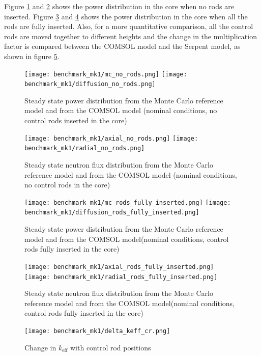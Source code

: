 \documentclass{elsarticle}
\newcommand{\keff}{{\ensuremath{k_{\mathrm{eff}}}} }
\begin{document}
Figure \ref{fig:mk1_no_power} and \ref{fig:mk1_no_rods_power} shows the power distribution in the core when no rods are inserted. Figure \ref{fig:mk1_full_power} and \ref{fig:mk1_full_rods_power} shows the power distribution in the core when all the rods are fully inserted.
Also, for a more quantitative comparison, all the control rods are moved together to different heights and the change in the multiplication factor is compared between the COMSOL model and the Serpent model, as shown in figure \ref{fig:delta_keff_cr}. 



\begin{figure}
\centering 
  \texttt{[image: benchmark\_mk1/mc\_no\_rods.png]}
  \texttt{[image: benchmark\_mk1/diffusion\_no\_rods.png]}
  \caption{Steady state power distribution from the Monte Carlo reference model and from the COMSOL model (nominal conditions, no control rods inserted in the core)}
  \label{fig:mk1_no_power}
\end{figure}

\begin{figure}
\centering 
  \texttt{[image: benchmark\_mk1/axial\_no\_rods.png]}
  \texttt{[image: benchmark\_mk1/radial\_no\_rods.png]}
  \caption{Steady state neutron flux distribution from the Monte Carlo reference model and from the COMSOL model (nominal conditions, no control rods in the core)}
  \label{fig:mk1_no_rods_power}
\end{figure}

\begin{figure}
\centering 
  \texttt{[image: benchmark\_mk1/mc\_rods\_fully\_inserted.png]}
  \texttt{[image: benchmark\_mk1/diffusion\_rods\_fully\_inserted.png]}
  \caption{Steady state power distribution from the Monte Carlo reference model and from the COMSOL model(nominal conditions, control rods fully inserted in the core)}
  \label{fig:mk1_full_power}
\end{figure}

\begin{figure}
\centering 
  \texttt{[image: benchmark\_mk1/axial\_rods\_fully\_inserted.png]}
  \texttt{[image: benchmark\_mk1/radial\_rods\_fully\_inserted.png]}
  \caption{Steady state neutron flux distribution from the Monte Carlo reference model and from the COMSOL model(nominal conditions, control rods fully inserted in the core)}
  \label{fig:mk1_full_rods_power}
\end{figure}



\begin{figure}
    \centering
    \texttt{[image: benchmark\_mk1/delta\_keff\_cr.png]}
    \caption{Change in \keff with control rod positions}
    \label{fig:delta_keff_cr}
\end{figure}
\end{document}
